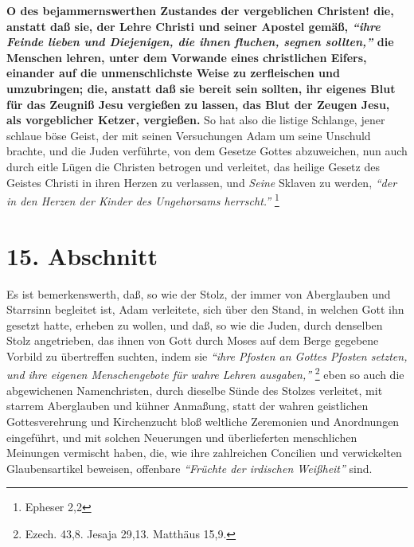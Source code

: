 \textbf{O des bejammernswerthen Zustandes der vergeblichen Christen! die, anstatt daß
sie, der Lehre Christi und seiner Apostel gemäß,
\textit{"`ihre Feinde lieben und
Diejenigen, die ihnen fluchen, segnen sollten,"'}
die Menschen lehren, unter dem
Vorwande eines christlichen Eifers, einander auf die unmenschlichste Weise zu
zerfleischen und umzubringen; die, anstatt daß sie bereit sein sollten, ihr
eigenes Blut für das Zeugniß Jesu vergießen zu lassen, das Blut der Zeugen Jesu,
als vorgeblicher Ketzer, vergießen.} So hat also die listige Schlange, jener
schlaue böse Geist, der mit seinen Versuchungen Adam um seine Unschuld
brachte, und die Juden verführte, von dem Gesetze Gottes abzuweichen, nun
auch durch eitle Lügen die Christen betrogen und verleitet, das heilige
Gesetz des Geistes Christi in ihren Herzen zu verlassen, und \textit{Seine}
Sklaven zu werden,
\textit{"`der in den Herzen der Kinder des Ungehorsams
herrscht."'}
\footnote{Epheser 2,2}

\section{15. Abschnitt} \label{kap7_ab15}

Es ist bemerkenswerth, daß, so wie der Stolz, der immer von Aberglauben und
Starrsinn begleitet ist, Adam verleitete, sich über den Stand, in welchen
Gott ihn gesetzt hatte, erheben zu wollen, und daß, so wie die Juden, durch
denselben Stolz angetrieben, das ihnen von Gott durch Moses auf dem Berge
gegebene Vorbild zu übertreffen suchten, indem sie
\textit{"`ihre Pfosten an Gottes
Pfosten setzten, und ihre eigenen Menschengebote für wahre Lehren
ausgaben,"'}
\footnote{Ezech. 43,8. Jesaja 29,13. Matthäus 15,9.}
eben so auch die
abgewichenen Namenchristen, durch dieselbe Sünde des Stolzes verleitet, mit
starrem Aberglauben und kühner Anmaßung, statt der wahren geistlichen
Gottesverehrung und Kirchenzucht bloß weltliche Zeremonien und Anordnungen
eingeführt, und mit solchen Neuerungen und überlieferten menschlichen Meinungen
vermischt haben, die, wie ihre zahlreichen Concilien und verwickelten
Glaubensartikel beweisen, offenbare \textit{"`Früchte der irdischen Weißheit"'} sind.

